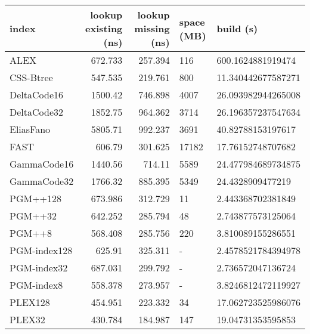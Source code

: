 \begin{tabular}{lrrll}
\hline
 index             &   lookup existing (ns) &   lookup missing (ns) & space (MB)   & build (s)             \\
\hline
 ALEX              &                672.733 &               257.394 & 116          & 600.1624881919474     \\
 CSS-Btree         &                547.535 &               219.761 & 800          & 11.340442677587271    \\
 DeltaCode16       &               1500.42  &               746.898 & 4007         & 26.093982944265008    \\
 DeltaCode32       &               1852.75  &               964.362 & 3714         & 26.196357237547634    \\
 EliasFano         &               5805.71  &               992.237 & 3691         & 40.82788153197617     \\
 FAST              &                606.79  &               301.625 & 17182        & 17.76152748707682     \\
 GammaCode16       &               1440.56  &               714.11  & 5589         & 24.477984689734875    \\
 GammaCode32       &               1766.32  &               885.395 & 5349         & 24.4328909477219      \\
 PGM++128          &                673.986 &               312.729 & 11           & 2.443368702381849     \\
 PGM++32           &                642.252 &               285.794 & 48           & 2.743877573125064     \\
 PGM++8            &                568.408 &               285.756 & 220          & 3.810089155286551     \\
 PGM-index128      &                625.91  &               325.311 & -            & 2.4578521784394978    \\
 PGM-index32       &                687.031 &               299.792 & -            & 2.736572047136724     \\
 PGM-index8        &                558.378 &               273.957 & -            & 3.8246812472119927    \\
 PLEX128           &                454.951 &               223.332 & 34           & 17.062723525986076    \\
 PLEX32            &                430.784 &               184.987 & 147          & 19.04731353595853     \\

\end{tabular}
